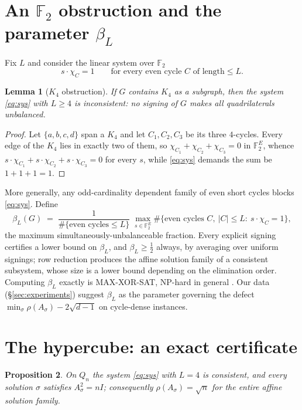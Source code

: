 \documentclass[11pt]{article}
\newtheorem{lemma}{Lemma}
\newtheorem{proposition}[lemma]{Proposition}
\theoremstyle{remark}
\newcommand{\F}{\mathbb{F}}
\newcommand{\rhomax}{\rho}
\begin{document}
\section{An $\F_2$ obstruction and the parameter $\beta_L$}

Fix $L$ and consider the linear system over $\F_2$
\begin{equation}\label{eq:sys}
s\cdot\chi_C=1\qquad\text{for every even cycle $C$ of length}\le L .
\end{equation}

\begin{lemma}[$K_4$ obstruction]\label{lem:k4}
If $G$ contains $K_4$ as a subgraph, then the system \eqref{eq:sys} with
$L\ge4$ is inconsistent: no signing of $G$ makes all quadrilaterals
unbalanced.
\end{lemma}

\begin{proof}
Let $\{a,b,c,d\}$ span a $K_4$ and let $C_1,C_2,C_3$ be its three
$4$-cycles. Every edge of the $K_4$ lies in exactly two of them, so
$\chi_{C_1}+\chi_{C_2}+\chi_{C_3}=0$ in $\F_2^E$, whence
$s\cdot\chi_{C_1}+s\cdot\chi_{C_2}+s\cdot\chi_{C_3}=0$ for every $s$,
while \eqref{eq:sys} demands the sum be $1+1+1=1$.
\end{proof}

More generally, any odd-cardinality dependent family of even short
cycles blocks \eqref{eq:sys}. Define
\[
\beta_L(G)\;=\;\frac{1}{\#\{\text{even cycles}\le L\}}\;
\max_{s\in\F_2^E}\#\{\text{even cycles }C,\ |C|\le L:\ s\cdot\chi_C=1\},
\]
the maximum simultaneously-unbalanceable fraction. Every explicit signing certifies a lower bound on $\beta_L$, and
$\beta_L\ge\tfrac12$ always, by averaging over uniform signings; row
reduction produces the affine solution family of a consistent
subsystem, whose size is a lower bound depending on the elimination
order. Computing $\beta_L$ exactly is MAX-XOR-SAT, NP-hard in general
\cite{hastad01}. Our data
(\S\ref{sec:experiments}) suggest $\beta_L$ as the parameter governing
the defect $\min_\sigma\rhomax(A_\sigma)-2\sqrt{d-1}$ on cycle-dense
instances.

\section{The hypercube: an exact certificate}

\begin{proposition}\label{prop:cube}
On $Q_n$ the system \eqref{eq:sys} with $L=4$ is consistent, and
\emph{every} solution $\sigma$ satisfies $A_\sigma^2=nI$; consequently
$\rhomax(A_\sigma)=\sqrt n$ for the entire affine solution family.
\end{proposition}
\end{document}

